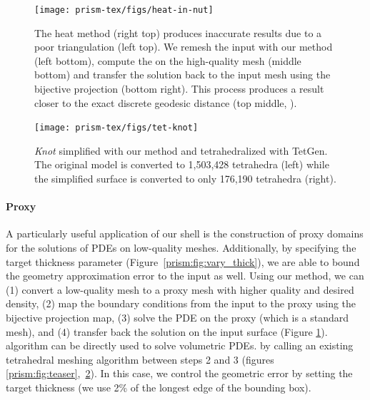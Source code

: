 

\begin{figure}
    \centering
    \texttt{[image: prism-tex/figs/heat-in-nut]}
    \caption{The heat method (right top) produces inaccurate results due to a poor triangulation (left top). We remesh the input with our method (left bottom), compute the  on the high-quality mesh (middle bottom) and transfer the solution back to the input mesh using the bijective projection (bottom right). This process produces a result closer to the exact discrete geodesic distance \cite{mitchell1987discrete} (top middle, ).}
    \label{prism:fig:proxy-heat}
    
\end{figure}


\begin{figure}
    \centering
    \texttt{[image: prism-tex/figs/tet-knot]}
    \caption{\emph{Knot} simplified with our method and tetrahedralized with TetGen. 
    The original model is converted to 1,503,428 tetrahedra (left) while the simplified surface is converted to only
    176,190 tetrahedra (right).}
    \label{prism:fig:proxy-tetgen}
    
\end{figure}


\paragraph{Proxy}
A particularly useful application of our shell is the construction of proxy domains for the solutions of PDEs on low-quality meshes. 
Additionally, by specifying the target thickness parameter (Figure~\ref{prism:fig:vary_thick}),
we are able to bound the geometry approximation error to the input as well.
Using our method,
we can (1) convert a low-quality mesh to a proxy mesh with higher quality and desired density, (2) map the boundary conditions from the input to the proxy using the bijective projection map, (3) solve the PDE on the proxy (which is a standard mesh), and (4) transfer back the solution on the input surface (Figure \ref{prism:fig:proxy-heat}). 
 algorithm can be directly used to solve volumetric PDEs.
by calling an existing tetrahedral meshing algorithm between steps 2 and 3 (figures \ref{prism:fig:teaser},~\ref{prism:fig:proxy-tetgen}). 
In this case, we control the geometric error by setting the target thickness (we use 2\% of the longest edge of the bounding box).

